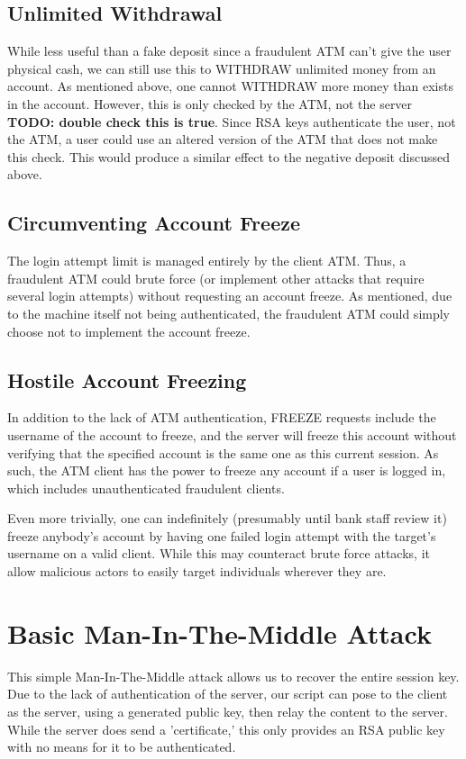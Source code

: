 \documentclass{article}
\begin{document}
\subsection{Unlimited Withdrawal}
While less useful than a fake deposit since a fraudulent ATM can't give the user physical cash, we can still use this to WITHDRAW unlimited money from an account. As mentioned above, one cannot WITHDRAW more money than exists in the account. However, this is only checked by the ATM, not the server \textbf{TODO: double check this is true}. Since RSA keys authenticate the user, not the ATM, a user could use an altered version of the ATM that does not make this check. This would produce a similar effect to the negative deposit discussed above.

\subsection{Circumventing Account Freeze}
The login attempt limit is managed entirely by the client ATM. Thus, a fraudulent ATM could brute force (or implement other attacks that require several login attempts) without requesting an account freeze. As mentioned, due to the machine itself not being authenticated, the fraudulent ATM could simply choose not to implement the account freeze.

\subsection{Hostile Account Freezing}
In addition to the lack of ATM authentication, FREEZE requests include the username of the account to freeze, and the server will freeze this account without verifying that the specified account is the same one as this current session. As such, the ATM client has the power to freeze any account if a user is logged in, which includes unauthenticated fraudulent clients.

Even more trivially, one can indefinitely (presumably until bank staff review it) freeze anybody's account by having one failed login attempt with the target's username on a valid client. While this may counteract brute force attacks, it allow malicious actors to easily target individuals wherever they are.

\section{Basic Man-In-The-Middle Attack}
This simple Man-In-The-Middle attack allows us to recover the entire session key.
Due to the lack of authentication of the server, our script can pose to the client as the server, using a generated public key, then relay the content to the server. While the server does send a 'certificate,' this only provides an RSA public key with no means for it to be authenticated.
\end{document}
